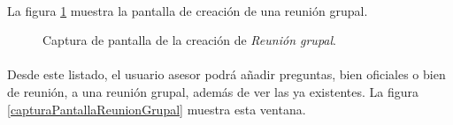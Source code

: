   \paragraph{}La figura \ref{capturaReunionGrupal} muestra la pantalla de
  creación de una reunión grupal.

  \begin{figure}[!ht]
    \begin{center}
      \caption{Captura de pantalla de la creación de \textit{Reunión grupal}.}
      \label{capturaReunionGrupal}
    \end{center}
  \end{figure}

  \paragraph{}Desde este listado, el usuario asesor podrá añadir preguntas,
  bien oficiales o bien de reunión, a una reunión grupal, además de ver las
  ya existentes. La figura \ref{capturaPantallaReunionGrupal} muestra esta
  ventana.

